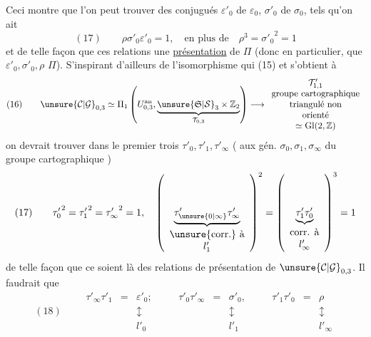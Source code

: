 

Ceci montre que l'on peut trouver
des conjugués $\varepsilon'_0$ de $\varepsilon_0$, $\sigma'_0$ de $\sigma_0$,
tels qu'on ait
\[
(17)\qquad
\rho\sigma'_0\varepsilon'_0=1,\quad
\text{en plus de}\quad \rho^3={\sigma'_0}^{2}=1
\]
et de telle façon que ces relations 
une \uline{présentation} de $\Pi$ (donc en particulier,
que $\varepsilon'_0,\sigma'_0,\rho$  \unsure{$\}$} $\Pi$).
S'inspirant d'ailleurs de l'isomorphisme  qui
 (15) et s'obtient à 
\[
(16)\qquad
\unsure{\mathcal{C}|\mathcal{G}}_{0,3}
\simeq\Pi_1\left(U_{0,3}^{\mathrm{an}},
\underbrace{\unsure{\mathfrak{S}|\mathcal{S}}_3\times\mathbb{Z}_2}_{\mathcal{T}_{0,3}}\right)
\longrightarrow
\begin{array}{c}
\mathcal{T}'_{1,1}\\
\text{groupe cartographique}\\
\text{triangulé non}\\
\text{orienté}\\
\simeq\mathrm{Gl}(2,\mathbb{Z})
\end{array}
\]
on devrait trouver dans le premier 
trois  $\tau'_0,\tau'_1,\tau'_\infty$
( aux gén. 
$\sigma_0,\sigma_1,\sigma_\infty$ du groupe cartographique
) 
\[
(17)\qquad
{\tau'_0}^{2}={\tau'_1}^{2}={\tau'_\infty}^{2}=1,\quad
\left(\underbrace{\tau'_{\unsure{0|\infty}}\tau'_\infty}_{\begin{array}{c}\text{\unsure{corr.} à}\\l'_1\end{array}}\right)^2
=\left(\underbrace{\tau'_1\tau'_0}_{\begin{array}{c}\text{corr. à}\\l'_\infty\end{array}}\right)^3=1
\]
de telle façon que ce soient là  des
relations de présentation de $\unsure{\mathcal{C}|\mathcal{G}}_{0,3}$.
Il faudrait que
\[
(18)\qquad
\begin{array}{rclcrclcrcl}
\tau'_\infty\tau'_1&=&\varepsilon'_0;&\quad&
\tau'_0\tau'_\infty&=&\sigma'_0,&\quad&
\tau'_1\tau'_0&=&\rho\\
&&\updownarrow&&&&\updownarrow&&&&\updownarrow\\
&&l'_0&&&&l'_1&&&&l'_\infty
\end{array}
\]

